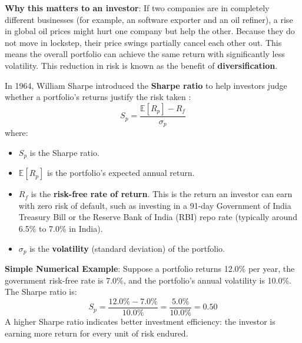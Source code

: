 \begin{enumerate}
    \textbf{Why this matters to an investor}: If two companies are in completely different businesses (for example, an software exporter and an oil refiner), a rise in global oil prices might hurt one company but help the other. Because they do not move in lockstep, their price swings partially cancel each other out. This means the overall portfolio can achieve the same return with significantly less volatility. This reduction in risk is known as the benefit of \textbf{diversification}.
\end{enumerate}

In 1964, William Sharpe introduced the \textbf{Sharpe ratio} to help investors judge whether a portfolio's returns justify the risk taken \cite{sharpe1964}:
\begin{equation}
S_p = \frac{\mathbb{E}[R_p] - R_f}{\sigma_p}
\end{equation}
where:
\begin{itemize}
    \item $S_p$ is the Sharpe ratio.
    \item $\mathbb{E}[R_p]$ is the portfolio's expected annual return.
    \item $R_f$ is the \textbf{risk-free rate of return}. This is the return an investor can earn with zero risk of default, such as investing in a 91-day Government of India Treasury Bill or the Reserve Bank of India (RBI) repo rate (typically around 6.5\% to 7.0\% in India).
    \item $\sigma_p$ is the \textbf{volatility} (standard deviation) of the portfolio.
\end{itemize}

\textbf{Simple Numerical Example}: Suppose a portfolio returns 12.0\% per year, the government risk-free rate is 7.0\%, and the portfolio's annual volatility is 10.0\%. The Sharpe ratio is:
\[
S_p = \frac{12.0\% - 7.0\%}{10.0\%} = \frac{5.0\%}{10.0\%} = 0.50
\]
A higher Sharpe ratio indicates better investment efficiency: the investor is earning more return for every unit of risk endured.

